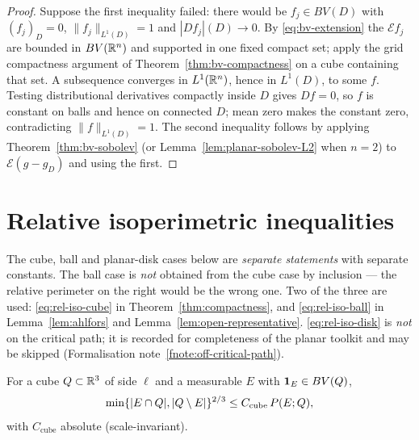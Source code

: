 \begin{proof}
Suppose the first inequality failed: there would be $f_j\in BV(D)$ with
$(f_j)_D=0$, $\|f_j\|_{L^1(D)}=1$ and $|Df_j|(D)\to0$.  By
\eqref{eq:bv-extension} the $\mathcal Ef_j$ are bounded in $BV(\mathbb R^n)$ and
supported in one fixed compact set; apply the grid compactness argument of
Theorem~\ref{thm:bv-compactness} on a cube containing that set.  A
subsequence converges in $L^1(\mathbb R^n)$, hence in $L^1(D)$, to some $f$.  Testing
distributional derivatives compactly inside $D$ gives $Df=0$, so $f$ is
constant on balls and hence on connected $D$; mean zero makes the constant
zero, contradicting $\|f\|_{L^1(D)}=1$.  The second inequality follows by
applying Theorem~\ref{thm:bv-sobolev} (or
Lemma~\ref{lem:planar-sobolev-L2} when $n=2$) to
$\mathcal E(g-g_D)$ and using the first.
\end{proof}

\section{Relative isoperimetric inequalities}

\begin{remark}\label{rem:three-signatures}
The cube, ball and planar-disk cases below are \emph{separate statements} with
separate constants.  The ball case is \emph{not} obtained from the cube case
by inclusion --- the relative perimeter on the right would be the wrong one.
Two of the three are used: \eqref{eq:rel-iso-cube} in
Theorem~\ref{thm:compactness}, and \eqref{eq:rel-iso-ball} in
Lemma~\ref{lem:ahlfors} and Lemma~\ref{lem:open-representative}.
\eqref{eq:rel-iso-disk} is \emph{not} on the critical path; it is recorded for
completeness of the planar toolkit and may be skipped
(Formalisation note~\ref{fnote:off-critical-path}).
\end{remark}

\begin{proposition}\label{prop:rel-iso-cube}
For a cube $Q\subset\mathbb R^3$ of side $\ell$ and a measurable $E$ with
$\mathbf 1_{E}\in BV(Q)$,
\begin{equation}\label{eq:rel-iso-cube}
  \min\{|E\cap Q|,|Q\setminus E|\}^{2/3}\le C_{\mathrm{cube}}\,P(E;Q),
\end{equation}
with $C_{\mathrm{cube}}$ absolute (scale-invariant).
\end{proposition}

